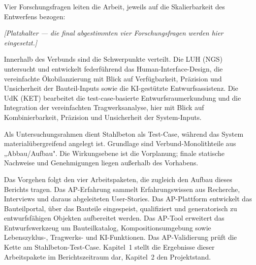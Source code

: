 \documentclass[type=zwischenbericht]{zukunftbau}
\begin{document}
Vier Forschungsfragen leiten die Arbeit, jeweils auf die Skalierbarkeit des Entwerfens bezogen:

\begin{Blockquote}
\textit{[Platzhalter --- die final abgestimmten vier Forschungsfragen werden hier eingesetzt.]}
\end{Blockquote}

Innerhalb des Verbunds sind die Schwerpunkte verteilt. Die LUH (NGS) untersucht und entwickelt federführend das Human-Interface-Design, die vereinfachte Ökobilanzierung mit Blick auf Verfügbarkeit, Präzision und Unsicherheit der Bauteil-Inputs sowie die KI-gestützte Entwurfsassistenz. Die UdK (KET) bearbeitet die test-case-basierte Entwurfsraumerkundung und die Integration der vereinfachten Tragwerksanalyse, hier mit Blick auf Kombinierbarkeit, Präzision und Unsicherheit der System-Inputs.

Als Untersuchungsrahmen dient Stahlbeton als Test-Case, während das System materialübergreifend angelegt ist. Grundlage sind Verbund-Monolithteile aus „Abbau/Aufbau". Die Wirkungsebene ist die Vorplanung; finale statische Nachweise und Genehmigungen liegen außerhalb des Vorhabens.

Das Vorgehen folgt den vier Arbeitspaketen, die zugleich den Aufbau dieses Berichts tragen. Das AP-Erfahrung sammelt Erfahrungswissen aus Recherche, Interviews und daraus abgeleiteten User-Stories. Das AP-Plattform entwickelt das Bauteilportal, über das Bauteile eingespeist, qualifiziert und generatorisch zu entwurfsfähigen Objekten aufbereitet werden. Das AP-Tool erweitert das Entwurfswerkzeug um Bauteilkatalog, Kompositionsumgebung sowie Lebenszyklus-, Tragwerks- und KI-Funktionen. Das AP-Validierung prüft die Kette am Stahlbeton-Test-Case. Kapitel~1 stellt die Ergebnisse dieser Arbeitspakete im Berichtszeitraum dar, Kapitel~2 den Projektstand.
\end{document}
